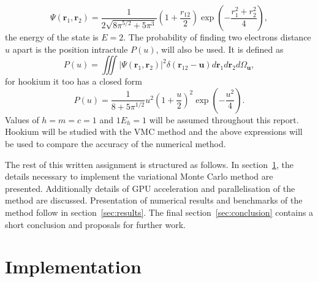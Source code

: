 \documentclass[final,3p,times,twocolumn]{elsarticle}
\begin{document}
	\begin{equation}
		\Psi\left(\mathbf{r}_{1}, \mathbf{r}_{2}\right)=\frac{1}{2 \sqrt{8 \pi^{5 / 2}+5 \pi^{3}}}\left(1+\frac{r_{12}}{2}\right) \exp \left(-\frac{r_{1}^{2}+r_{2}^{2}}{4}\right), 
	\end{equation}
	the energy of the state is $E=2$. The probability of finding two electrons distance $u$ apart is the position intractule $P(u)$, will also be used. It is defined as
	\begin{equation}
		P(u)=\iiint\left|\Psi\left(\mathbf{r}_{1}, \mathbf{r}_{2}\right)\right|^{2} \delta\left(\mathbf{r}_{12}-\mathbf{u}\right) d \mathbf{r}_{1} d \mathbf{r}_{2} d \Omega_{\mathbf{u}},
	\end{equation}
	for hookium it too has a closed form
	\begin{equation}
		P(u)=\frac{1}{8+5 \pi^{1 / 2}} u^{2}\left(1+\frac{u}{2}\right)^{2} \exp \left(-\frac{u^{2}}{4}\right).
	\end{equation}
	Values of $h=m=c=1$ and $1E_h = 1$ will be assumed throughout this report. 
	Hookium will be studied with the VMC method and the above expressions will be used to compare the accuracy of the numerical method.
	
	The rest of this written assignment is structured as follows. In section~\ref{sec:impl}, the details necessary to implement the variational Monte Carlo method are presented. Additionally details of GPU acceleration and parallelisation of the method are discussed. Presentation of numerical results and benchmarks of the method follow in section~\ref{sec:results}. The final section~\ref{sec:conclusion} contains a short conclusion and proposals for further work. 
	\section{Implementation}
	\label{sec:impl}
	
\end{document}
